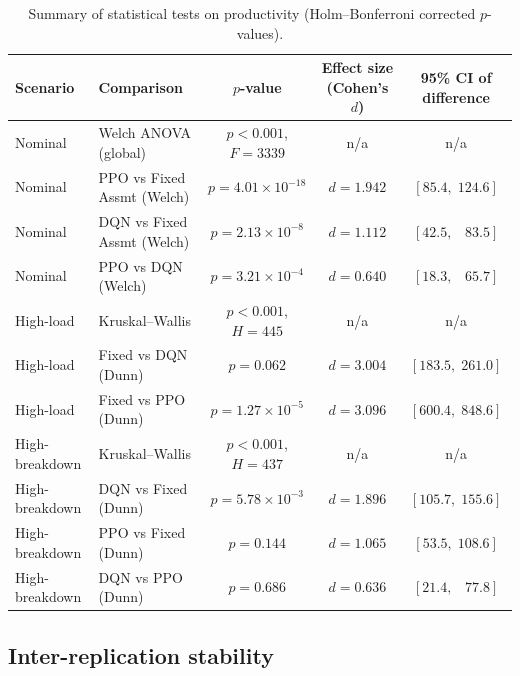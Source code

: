 \documentclass[11pt,a4paper]{article}
\begin{document}
\begin{table}[H]
\centering
\caption{Summary of statistical tests on productivity (Holm--Bonferroni corrected $p$-values).}
\label{tab:stats}
\scriptsize
\setlength{\tabcolsep}{3pt}
\begin{tabular}{llccc}
\toprule
\textbf{Scenario} & \textbf{Comparison} & \textbf{$p$-value} & \textbf{Effect size (Cohen's $d$)} & \textbf{95\% CI of difference} \\
\midrule
Nominal        & Welch ANOVA (global)      & $p < 0.001$, $F=3339$ & n/a & n/a \\
Nominal        & PPO vs Fixed Assmt (Welch)  & $p=4.01\times10^{-18}$ & $d=1.942$ & $[85.4,\;124.6]$ \\
Nominal        & DQN vs Fixed Assmt (Welch)  & $p=2.13\times10^{-8}$ & $d=1.112$ & $[42.5,\;\;\;83.5]$ \\
Nominal        & PPO vs DQN (Welch)          & $p=3.21\times10^{-4}$ & $d=0.640$ & $[18.3,\;\;\;65.7]$ \\
High-load      & Kruskal--Wallis              & $p < 0.001$, $H=445$            & n/a & n/a \\
High-load      & Fixed vs DQN (Dunn)          & $p = 0.062$                     & $d=3.004$ & $[183.5,\;261.0]$ \\
High-load      & Fixed vs PPO (Dunn)                & $p = 1.27\times10^{-5}$         & $d=3.096$ & $[600.4,\;848.6]$ \\
High-breakdown & Kruskal--Wallis              & $p < 0.001$, $H=437$            & n/a & n/a \\
High-breakdown & DQN vs Fixed (Dunn)                & $p = 5.78\times10^{-3}$         & $d=1.896$ & $[105.7,\;155.6]$ \\
High-breakdown & PPO vs Fixed (Dunn)          & $p = 0.144$                     & $d=1.065$ & $[53.5,\;108.6]$ \\
High-breakdown & DQN vs PPO (Dunn)            & $p = 0.686$                     & $d=0.636$ & $[21.4,\;\;\;77.8]$ \\
\bottomrule
\end{tabular}
\end{table}

\subsection{Inter-replication stability}
\label{sec:stability}
\end{document}
